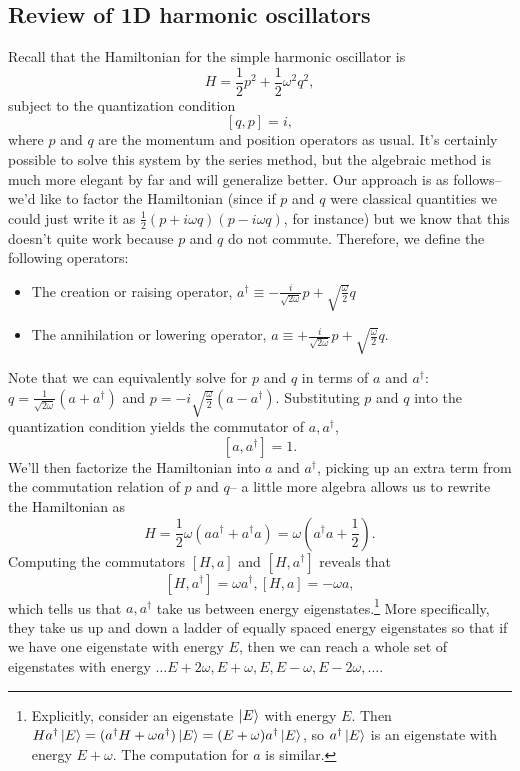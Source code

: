\subsection*{Review of 1D harmonic oscillators} Recall that the Hamiltonian for the simple harmonic oscillator is
$$H=\frac{1}{2} p^2 +\frac{1}{2} \omega^2 q^2,$$
subject to the quantization condition $$[q,p]=i,$$ 
where $p$ and $q$ are the momentum and position operators as usual. It's certainly possible to solve this system by the series method, but the algebraic method is much more elegant by far and will generalize better. Our approach is as follows-- we'd like to factor the Hamiltonian (since if $p$ and $q$ were classical quantities we could just write it as $\frac{1}{2}(p+i\omega q)(p-i\omega q)$, for instance) but we know that this doesn't quite work because $p$ and $q$ do not commute. Therefore, we define the following operators:
\begin{itemize}
\item The creation or raising operator, $a^\dagger \equiv -\frac{i}{\sqrt{2\omega}} p +\sqrt{\frac{\omega}{2}}q$
\item The annihilation or lowering operator, $a \equiv +\frac{i}{\sqrt{2\omega}} p +\sqrt{\frac{\omega}{2}}q$.
\end{itemize}
Note that we can equivalently solve for $p$ and $q$ in terms of $a$ and $a^\dagger$: $q=\frac{1}{\sqrt{2\omega}}(a+a^\dagger)$ and $p=-i \sqrt{\frac{\omega}{2}}(a-a^\dagger)$. Substituting $p$ and $q$ into the quantization condition yields the commutator of $a,a^\dagger$,
$$[a,a^\dagger]=1.$$
We'll then factorize the Hamiltonian into $a$ and $a^\dagger$, picking up an extra term from the commutation relation of $p$ and $q$-- a little more algebra allows us to rewrite the Hamiltonian as
$$H=\frac{1}{2}\omega (a a^\dagger+ a^\dagger a)=\omega (a^\dagger a +\frac{1}{2}).$$
Computing the commutators $[H,a]$ and $[H,a^\dagger]$ reveals that
$$[H,a^\dagger]=\omega a^\dagger, [H,a]=-\omega a,$$
which tells us that $a,a^\dagger$ take us between energy eigenstates.\footnote{Explicitly, consider an eigenstate $\left| E \right>$ with energy $E$. Then $H a^\dagger \left| E \right>=(a^\dagger H +\omega a^\dagger)\left| E \right> =(E+\omega)a^\dagger \left| E \right>$, so $a^\dagger \left| E \right>$ is an eigenstate with energy $E+\omega.$ The computation for $a$ is similar.} More specifically, they take us up and down a ladder of equally spaced energy eigenstates so that if we have one eigenstate with energy $E$, then we can reach a whole set of eigenstates with energy $\ldots E+2\omega, E+\omega, E, E-\omega, E-2\omega, \ldots$.

